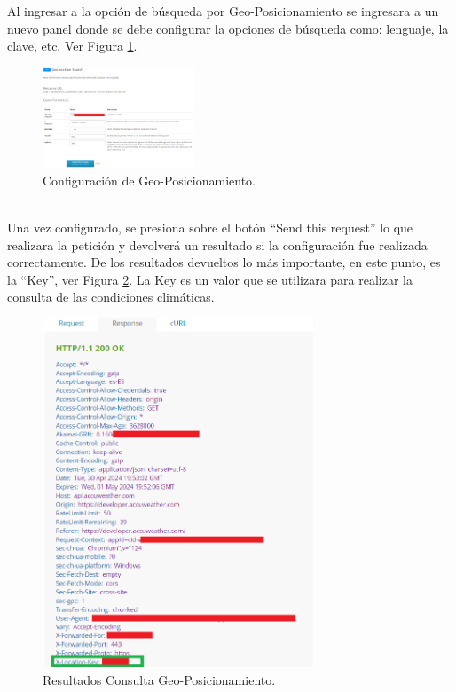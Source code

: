\documentclass[a4paper,10pt, oneside, titlepage]{article}
\begin{document}
	\indent Al ingresar a la opción de búsqueda por Geo-Posicionamiento se ingresara a un  nuevo panel donde se debe configurar la opciones de búsqueda como: lenguaje, la clave, etc. Ver Figura \ref{AccuWeather_Geoposition_Configuracion}.
	\begin{figure}[!h]
		\centering
		\includegraphics[width = 1\linewidth, height = 3cm]{AccuWeather_Geoposition_Configuracion.png}
		\caption{Configuración de Geo-Posicionamiento.}
		\label{AccuWeather_Geoposition_Configuracion}
	\end{figure} \\
	\indent Una vez configurado, se presiona sobre el botón ``Send this request'' lo que realizara la petición y devolverá un resultado si la configuración fue realizada correctamente. De los resultados devueltos lo más importante, en este punto, es la ``Key'', ver Figura \ref{Resultados_Query_Geo_AccuWeather}. La Key es un valor que se utilizara para realizar la consulta de las condiciones climáticas.
	\begin{figure}[!h]
		\centering
		\includegraphics[width = 1\linewidth, height = 10.4cm]{Resultados_Query_Geo_AccuWeather.png}
		\caption{Resultados Consulta Geo-Posicionamiento.}
		\label{Resultados_Query_Geo_AccuWeather}
	\end{figure} \\
\end{document}
